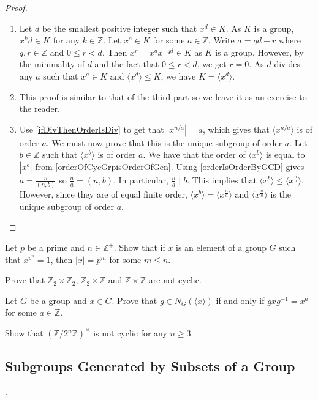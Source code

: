 \begin{proof}
    \phantom{beegyoshi}
    \begin{enumerate}
        \item Let $d$ be the smallest positive integer such that $x^d\in K$. As $K$ is a group, $x^kd\in K$ for any $k\in\mathbb{Z}$. Let $x^a\in K$ for some $a\in\mathbb{Z}$. Write $a=qd+r$ where $q,r\in\mathbb{Z}$ and $0\leq r<d$. Then $x^r=x^{a}x^{-qd}\in K$ as $K$ is a group. However, by the minimality of $d$ and the fact that $0\leq r<d$, we get $r=0$. As $d$ divides any $a$ such that $x^a\in K$ and $\langle x^d\rangle\leq K$, we have $K=\langle x^d\rangle$.
        \item This proof is similar to that of the third part so we leave it as an exercise to the reader.
        \item Use \ref{ifDivThenOrderIsDiv} to get that $|x^{n/a}|=a$, which gives that $\langle x^{n/a}\rangle$ is of order $a$. We must now prove that this is the unique subgroup of order $a$. Let $b\in\mathbb{Z}$ such that $\langle x^b\rangle$ is of order $a$. We have that the order of $\langle x^b\rangle$ is equal to $|x^b|$ from \ref{orderOfCycGrpisOrderOfGen}. Using \ref{orderIsOrderByGCD} gives $a=\frac{n}{(n,b)}$ so $\frac na=(n,b)$. In particular, $\frac na\mid b$. This implies that $\langle x^b\rangle\leq\langle x^\frac{n}{a}\rangle$. However, since they are of equal finite order, $\langle x^b\rangle=\langle x^\frac{n}{a}\rangle$ and $\langle x^\frac{n}{a}\rangle$ is the unique subgroup of order $a$. 
    \end{enumerate}
\end{proof}

\begin{exercise}
    Let $p$ be a prime and $n\in\mathbb{Z}^+$. Show that if $x$ is an element of a group $G$ such that $x^{p^n}=1$, then $|x|=p^m$ for some $m\leq n$.
\end{exercise}

\begin{exercise}
    Prove that $\mathbb{Z}_2\times\mathbb{Z}_2$, $\mathbb{Z}_2\times\mathbb{Z}$ and $\mathbb{Z}\times\mathbb{Z}$ are not cyclic.
\end{exercise}

\begin{exercise}
    Let $G$ be a group and $x\in G$. Prove that $g\in N_G(\langle x\rangle)$ if and only if $gxg^{-1}=x^a$ for some $a\in\mathbb{Z}$.
\end{exercise}

\begin{exercise}
    Show that $(\mathbb{Z}/2^n\mathbb{Z})^\times$ is not cyclic for any $n\geq 3$.
\end{exercise}

\subsection{Subgroups Generated by Subsets of a Group}

.

\clearpage